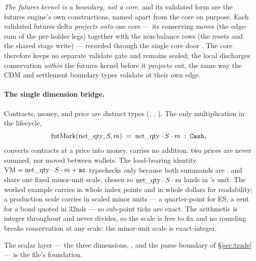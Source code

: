 \noindent\emph{The futures kernel is a boundary, not a core.}  and its validated
form  are the futures engine's own constructions, named apart from the core
 on purpose. Each validated futures delta \emph{projects onto} one core
 --- its conserving moves (the edge-sum of the per-holder legs) together with the
non-balance rows (the \ac{} resets and the shared stage write) --- recorded through the single core
door . The core therefore keeps no separate validate gate and remains sealed; the
local  discharges conservation \emph{within} the futures kernel before it projects
out, the same way the CDM and settlement boundary types validate at their own edge.

\paragraph{The single dimension bridge.} Contracts, money, and price are distinct types
(, , ). The only multiplication in the lifecycle,
\[
\mathrm{futMark}(\mathrm{net\_qty}, S, m) \;=\; \mathrm{net\_qty} \cdot S \cdot m \;:\; \texttt{Cash},
\]
converts contracts at a price into money.  carries no addition: two prices are never
summed, nor moved between wallets. The load-bearing identity $\mathrm{VM}=\mathrm{net\_qty}\cdot S\cdot m+\texttt{ac}$
typechecks only because both summands are .  and  share one fixed
minor-unit scale, chosen so $\mathrm{net\_qty}\cdot S\cdot m$ lands in 's unit. The worked example
carries  in whole index points and  in whole dollars for readability; a
production scale carries  in scaled minor units --- a quarter-point for ES, a cent for a
bond quoted in 32nds --- so sub-point ticks are exact. The arithmetic is integer throughout and never
divides, so the scale is free to fix and no rounding breaks conservation at any scale: the minor-unit
scale is exact-integer.

The scalar layer --- the three dimensions, , and the  parse boundary of
\S\ref{sec:trade} --- is the file's foundation.

